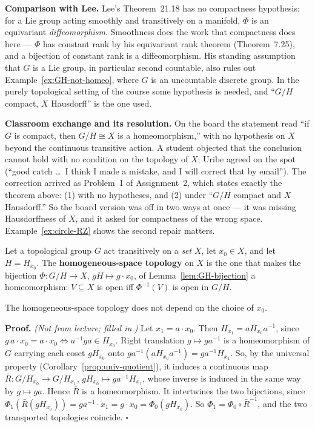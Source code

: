 \documentclass[11pt]{report}
\makeatletter
\newcounter{defcounter}[section]
\newcounter{thmcounter}[section]
\renewenvironment{proof}[1][Proof]{\noindent\textbf{#1.} }{\hfill$\square$\par\vspace{5pt}}
\newcommand{\thmlabel}[1]{\edef\@currentlabel{\arabic{section}.\arabic{thmcounter}}\label{#1}}
\newcommand{\deflabel}[1]{\edef\@currentlabel{\arabic{section}.\arabic{defcounter}}\label{#1}}
\newcommand{\leeref}[1]{\par\smallskip{\raggedleft\footnotesize\textsc{Lee}:\ #1\par}}
\makeatother
\begin{document}
\textbf{Comparison with Lee.} Lee's Theorem~21.18 has no compactness hypothesis: for a Lie group acting smoothly and transitively on a manifold, $\Phi$ is an equivariant \emph{diffeomorphism}. Smoothness does the work that compactness does here --- $\Phi$ has constant rank by his equivariant rank theorem (Theorem~7.25), and a bijection of constant rank is a diffeomorphism. His standing assumption that $G$ is a Lie group, in particular second countable, also rules out Example~\ref{ex:GH-not-homeo}, where $G$ is an uncountable discrete group. In the purely topological setting of the course some hypothesis is needed, and ``$G/H$ compact, $X$ Hausdorff'' is the one used.


\textbf{Classroom exchange and its resolution.} On the board the statement read ``if $G$ is compact, then $G/H \cong X$ is a homeomorphism,'' with no hypothesis on $X$ beyond the continuous transitive action. A student objected that the conclusion cannot hold with no condition on the topology of $X$; Uribe agreed on the spot (``good catch \ldots\ I think I made a mistake, and I will correct that by email''). The correction arrived as Problem~1 of Assignment~2, which states exactly the theorem above: (1) with no hypotheses, and (2) under ``$G/H$ compact and $X$ Hausdorff.'' So the board version was off in two ways at once --- it was missing Hausdorffness of $X$, and it asked for compactness of the wrong space. Example~\ref{ex:circle-RZ} shows the second repair matters.

\begin{defbox}\deflabel{def:homogeneous-topology}
Let a topological group $G$ act transitively on a \emph{set} $X$, let $x_0 \in X$, and let $H = H_{x_0}$. The \textbf{homogeneous-space topology} on $X$ is the one that makes the bijection $\Phi : G/H \to X$, $gH \mapsto g \cdot x_0$, of Lemma~\ref{lem:GH-bijection} a homeomorphism: $V \subseteq X$ is open iff $\Phi^{-1}(V)$ is open in $G/H$.
\leeref{Theorem 21.20}
\end{defbox}

\begin{propbox}\thmlabel{prop:homog-basepoint}
The homogeneous-space topology does not depend on the choice of $x_0$.
\leeref{Theorem 21.20}
\end{propbox}

\begin{proof}
\textit{(Not from lecture; filled in.)} Let $x_1 = a \cdot x_0$. Then $H_{x_1} = aH_{x_0}a^{-1}$, since $g\,a\cdot x_0 = a\cdot x_0 \iff a^{-1}ga \in H_{x_0}$. Right translation $g \mapsto ga^{-1}$ is a homeomorphism of $G$ carrying each coset $gH_{x_0}$ onto $ga^{-1}(aH_{x_0}a^{-1}) = ga^{-1}H_{x_1}$. So, by the universal property (Corollary~\ref{prop:univ-quotient}), it induces a continuous map $\bar R : G/H_{x_0} \to G/H_{x_1}$, $gH_{x_0} \mapsto ga^{-1}H_{x_1}$, whose inverse is induced in the same way by $g \mapsto ga$. Hence $\bar R$ is a homeomorphism. It intertwines the two bijections, since $\Phi_1(\bar R(gH_{x_0})) = ga^{-1}\cdot x_1 = g \cdot x_0 = \Phi_0(gH_{x_0})$. So $\Phi_1 = \Phi_0 \circ \bar R^{-1}$, and the two transported topologies coincide.
\end{proof}
\end{document}
